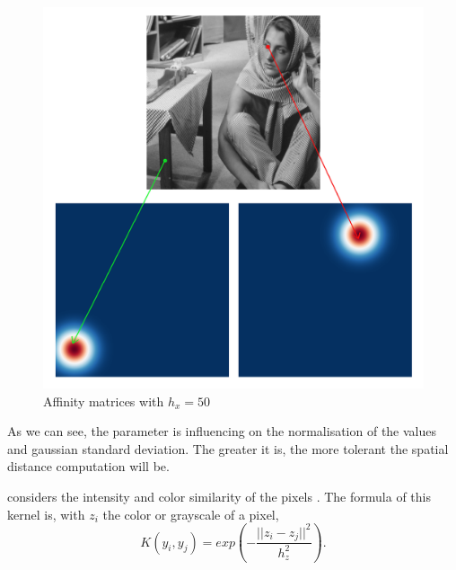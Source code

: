 \begin{description}[align=left]
  \begin{figure}[H]
      \centering
      \includegraphics[width=\textwidth]{img/spatialAffinitySigma50.png}
      \caption{Affinity matrices with \(h_x = 50\)}
  \end{figure}
  As we can see, the parameter is influencing on the normalisation of the values and gaussian standard deviation.
  The greater it is, the more tolerant the spatial distance computation will be.

 \item [Photometric Gaussian Kernel] considers the intensity and color similarity of the pixels \cite{siam_slides_2016}.
  The formula of this kernel is, with \(z_i\) the color or grayscale of a pixel,
  \[K(y_i, y_j) = exp(-\frac{||z_i - z_j||^2}{h_z^2}).\]


\end{description}
